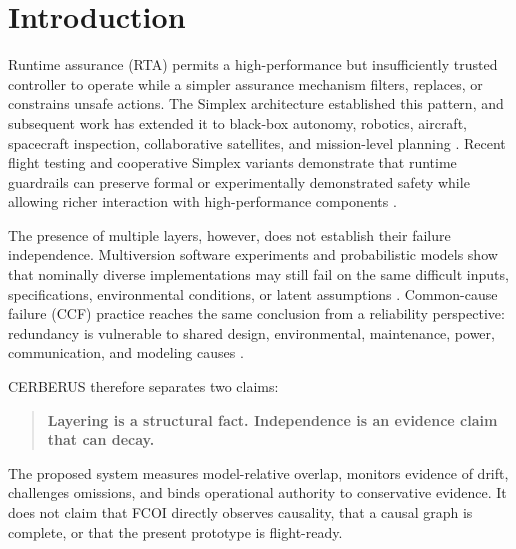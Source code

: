 \section{Introduction}
Runtime assurance (RTA) permits a high-performance but insufficiently trusted controller to operate while a simpler assurance mechanism filters, replaces, or constrains unsafe actions. The Simplex architecture established this pattern, and subsequent work has extended it to black-box autonomy, robotics, aircraft, spacecraft inspection, collaborative satellites, and mission-level planning \cite{Seto1998,Sha2001,Mehmood2022,HobbsTutorial2021,BratPai2023,Dunlap2023,Hobbs2025,RTAEval2023,MissionLevelRTA2026}. Recent flight testing and cooperative Simplex variants demonstrate that runtime guardrails can preserve formal or experimentally demonstrated safety while allowing richer interaction with high-performance components \cite{Guardrails2026,SynergisticSimplex2026}.

The presence of multiple layers, however, does not establish their failure independence. Multiversion software experiments and probabilistic models show that nominally diverse implementations may still fail on the same difficult inputs, specifications, environmental conditions, or latent assumptions \cite{KnightLeveson1986,EckhardtLee1985,LittlewoodMiller1989,SalakoStrigini2014}. Common-cause failure (CCF) practice reaches the same conclusion from a reliability perspective: redundancy is vulnerable to shared design, environmental, maintenance, power, communication, and modeling causes \cite{Vesely1981,Mosleh1988,Mosleh1998,IEC61508_6_2010,Stott2010,Hark2015,MaKvarfordt2022}.

CERBERUS therefore separates two claims:
\begin{quote}
\textbf{Layering is a structural fact. Independence is an evidence claim that can decay.}
\end{quote}
The proposed system measures model-relative overlap, monitors evidence of drift, challenges omissions, and binds operational authority to conservative evidence. It does not claim that FCOI directly observes causality, that a causal graph is complete, or that the present prototype is flight-ready.

